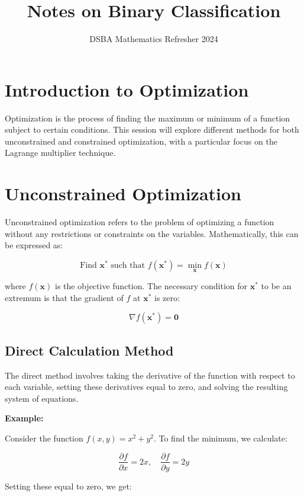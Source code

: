 \documentclass[]{article}
\title{Notes on Binary Classification}
\author{DSBA Mathematics Refresher 2024}
\date{}
\begin{document}
	
	\maketitle
	
	\begin{abstract}
		
	\end{abstract}
	
	\section{Introduction to Optimization}
	Optimization is the process of finding the maximum or minimum of a function subject to certain conditions. This session will explore different methods for both unconstrained and constrained optimization, with a particular focus on the Lagrange multiplier technique. 
	
	\section{Unconstrained Optimization}
	
	Unconstrained optimization refers to the problem of optimizing a function without any restrictions or constraints on the variables. Mathematically, this can be expressed as:
	
	\[
	\text{Find } \mathbf{x}^* \text{ such that } f(\mathbf{x}^*) = \min_{\mathbf{x}} f(\mathbf{x})
	\]
	
	where \( f(\mathbf{x}) \) is the objective function. The necessary condition for \(\mathbf{x}^*\) to be an extremum is that the gradient of \( f \) at \( \mathbf{x}^* \) is zero:
	
	\[
	\nabla f(\mathbf{x}^*) = \mathbf{0}
	\]
	
	\subsection{Direct Calculation Method}
	The direct method involves taking the derivative of the function with respect to each variable, setting these derivatives equal to zero, and solving the resulting system of equations.
	
	\textbf{Example:}
	
	Consider the function \( f(x, y) = x^2 + y^2 \). To find the minimum, we calculate:
	
	\[
	\frac{\partial f}{\partial x} = 2x, \quad \frac{\partial f}{\partial y} = 2y
	\]
	
	Setting these equal to zero, we get:
	
\end{document}
